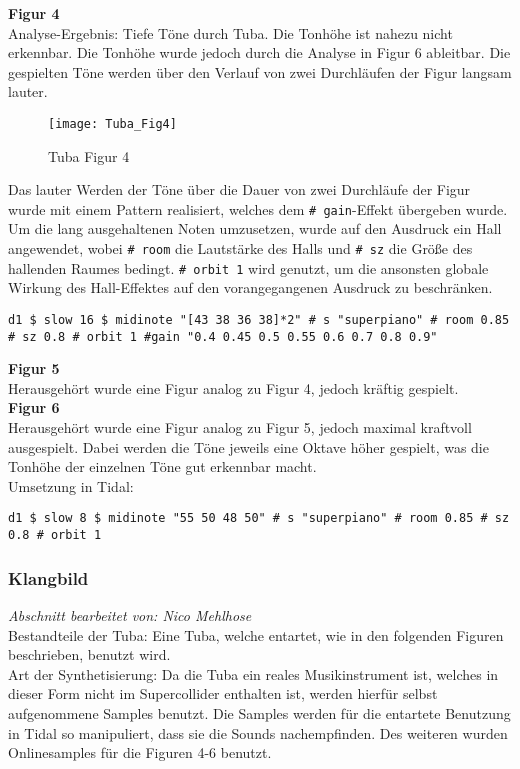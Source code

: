 \documentclass[
10pt, %
a4paper, %
oneside, %
headinclude,footinclude, %
BCOR5mm, %
]{scrartcl}
\begin{document}
\noindent\textbf{Figur 4}\\
Analyse-Ergebnis: Tiefe Töne durch Tuba. Die Tonhöhe ist nahezu nicht erkennbar. Die Tonhöhe wurde jedoch durch die Analyse in Figur 6 ableitbar. Die gespielten Töne werden über den Verlauf von zwei Durchläufen der Figur langsam lauter.\\

\begin{figure}[h]
	\centering 
	\texttt{[image: Tuba\_Fig4]} 
	\caption{Tuba Figur 4}
\end{figure}

\noindent Das lauter Werden der Töne über die Dauer von zwei Durchläufe der Figur wurde mit einem Pattern realisiert, welches dem \verb|# gain|-Effekt übergeben wurde.\cite{tid10} Um die lang ausgehaltenen Noten umzusetzen, wurde auf den Ausdruck ein Hall angewendet, wobei \verb|# room| die Lautstärke des Halls und \verb|# sz| die Größe des hallenden Raumes bedingt. \verb|# orbit 1| wird genutzt, um die ansonsten globale Wirkung des Hall-Effektes auf den vorangegangenen Ausdruck zu beschränken. \cite{tid11} 

\begin{lstlisting}
d1 $ slow 16 $ midinote "[43 38 36 38]*2" # s "superpiano" # room 0.85 # sz 0.8 # orbit 1 #gain "0.4 0.45 0.5 0.55 0.6 0.7 0.8 0.9"
\end{lstlisting}


\noindent\textbf{Figur 5}\\
Herausgehört wurde eine Figur analog zu Figur 4, jedoch kräftig gespielt.\\

\noindent\textbf{Figur 6}\\
Herausgehört wurde eine Figur analog zu Figur 5, jedoch maximal kraftvoll ausgespielt. Dabei werden die Töne jeweils eine Oktave höher gespielt, was die Tonhöhe der einzelnen Töne gut erkennbar macht.\\

\noindent Umsetzung in Tidal:
\begin{lstlisting}
d1 $ slow 8 $ midinote "55 50 48 50" # s "superpiano" # room 0.85 # sz 0.8 # orbit 1
\end{lstlisting}

\subsubsection{Klangbild}
\textit{Abschnitt bearbeitet von: Nico Mehlhose}\\
\noindent Bestandteile der Tuba: Eine Tuba, welche entartet, wie in den folgenden Figuren beschrieben, benutzt wird.\\
Art der Synthetisierung: Da die Tuba ein reales Musikinstrument ist, welches in dieser Form nicht im Supercollider enthalten ist,
werden hierfür selbst aufgenommene Samples benutzt. Die Samples werden für die entartete Benutzung in Tidal so manipuliert, dass sie die Sounds
nachempfinden. Des weiteren wurden Onlinesamples für die Figuren 4-6 benutzt.\cite{Orch}\\
\end{document}
